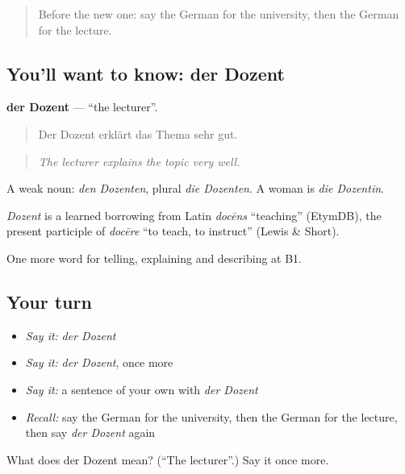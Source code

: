 \begin{quote}
Before the new one: say the German for the university, then the German for the lecture.
\end{quote}

\subsection*{You'll want to know: der Dozent}
\textbf{der Dozent} — \textquotedblleft{}the lecturer\textquotedblright{}.

\begin{quote}
Der Dozent erklärt das Thema sehr gut.
\end{quote}

\begin{quote}
\emph{The lecturer explains the topic very well.}
\end{quote}

A weak noun: \emph{den Dozenten}, plural \emph{die Dozenten}. A woman is \emph{die Dozentin}.

\begin{cousinweb}
\emph{Dozent} is a learned borrowing from Latin \emph{docēns} \textquotedblleft{}teaching\textquotedblright{} (EtymDB), the present participle of \emph{docēre} \textquotedblleft{}to teach, to instruct\textquotedblright{} (Lewis \& Short).
\end{cousinweb}

\begin{grammarlens}[title={What you've built}]
One more word for telling, explaining and describing at B1.
\end{grammarlens}

\subsection*{Your turn}
\begin{itemize}
\raggedright
  \item \emph{Say it:} \emph{der Dozent}
  \item \emph{Say it:} \emph{der Dozent}, once more
  \item \emph{Say it:} a sentence of your own with \emph{der Dozent}
  \item \emph{Recall:} say the German for the university, then the German for the lecture, then say \emph{der Dozent} again
\end{itemize}

\begin{tcolorbox}[breakable,colback=teal!4,colframe=teal!35!black,title={Before you move on}]
What does der Dozent mean? (\textquotedblleft{}The lecturer\textquotedblright{}.) Say it once more.
\end{tcolorbox}
